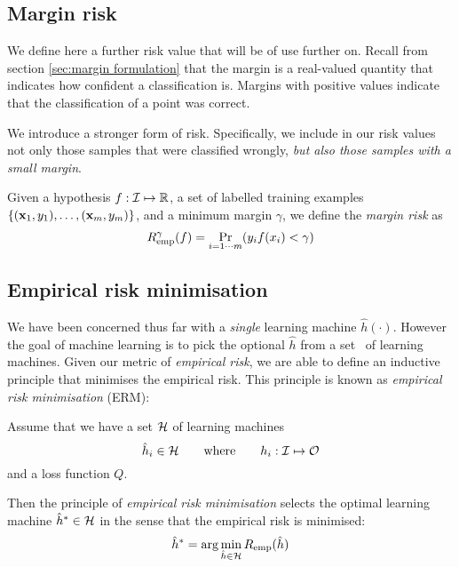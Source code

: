\subsection{Margin risk}

We define here a further risk value that will be of use further on.
Recall from section \ref{sec:margin formulation} that the margin is a
real-valued quantity that indicates how confident a classification
is.  Margins with positive values indicate that the classification of
a point was correct.

We introduce a stronger form of risk.  Specifically, we include in our
risk values not only those samples that were classified wrongly,
\emph{but also those samples with a small margin}.

\begin{definition}
Given a hypothesis $f : \mathcal{I} \mapsto \mathbb{R}$, a set of
labelled training examples $\{(\mathbf{x}_1, y_1), \ldots, (\mathbf{x}_m, y_m)\}$,
and a minimum margin $\gamma$, we define the \emph{margin risk} as
%
\begin{equation}
R^{\gamma}_{\mathrm{emp}}(f) = \Pr_{i=1\cdots m}(y_i f(x_i) < \gamma)
\end{equation}
\end{definition}


\subsection{Empirical risk minimisation}

We have been concerned thus far with a \emph{single} learning
machine $\hat{h}(\cdot)$.  However the goal of machine learning is to
pick the optional $\hat{h}$  from a set \calH\ of learning machines.
Given our metric of \emph{empirical risk}, we are able to define an
inductive principle that minimises the empirical risk.  This principle
is known as \emph{empirical risk minimisation} (ERM):

Assume that we have a set $\mathcal{H}$ of learning machines
%
\begin{equation}
\hat{h}_i \in \mathcal{H} \qquad \mbox{where} \qquad h_i : \mathcal{I} \mapsto
\mathcal{O}
\end{equation}
%
and a loss function $Q$.

Then the principle of \emph{empirical risk minimisation} selects the
optimal learning machine $\hat{h}^{\ast} \in \mathcal{H}$ in the sense that
the empirical risk is minimised:
%
\begin{equation}
\hat{h}^{\ast} = \arg \min_{\hat{h} \in \mathcal{H}} R_{\mathrm{emp}}(\hat{h})
\label{eqn:erm}
\end{equation}

